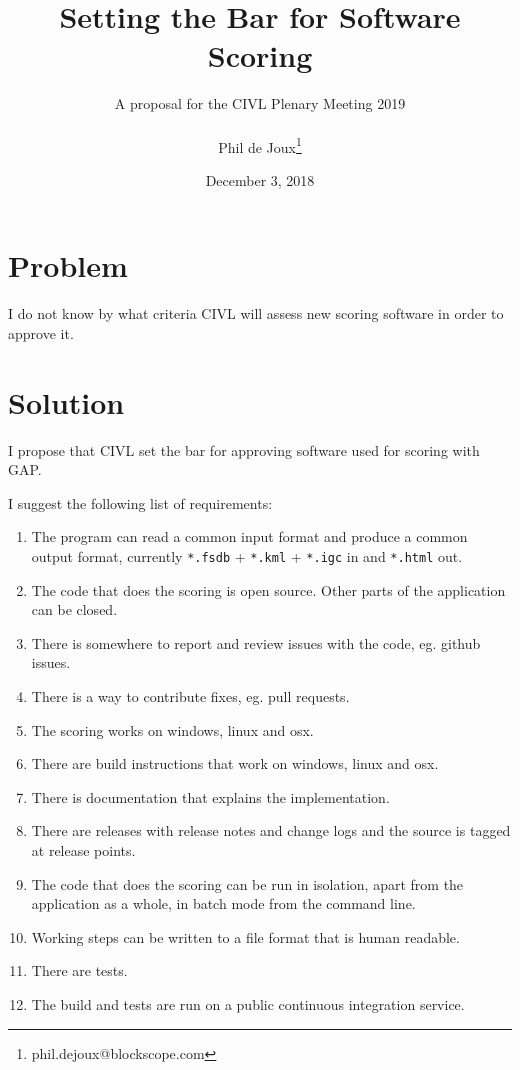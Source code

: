 \documentclass{article}
\title{Setting the Bar for Software Scoring}
\date{December 3, 2018}
\author{A proposal for the CIVL Plenary Meeting 2019\\\\
Phil de Joux\thanks{phil.dejoux@blockscope.com}}
\begin{document}
\maketitle
\section*{Problem}
I do not know by what criteria CIVL will assess new scoring software in order
to approve it.

\section*{Solution}
I propose that CIVL set the bar for approving software used for scoring with
GAP.

I suggest the following list of requirements:\\
\begin{enumerate}
    \item The program can read a common input format and produce a common
    output format, currently \texttt{*.fsdb} + \texttt{*.kml} + \texttt{*.igc}
    in and \texttt{*.html} out.
    \item The code that does the scoring is open source. Other parts of the
    application can be closed.
    \item There is somewhere to report and review issues with the code, eg.
    github issues.
    \item There is a way to contribute fixes, eg. pull requests.
    \item The scoring works on windows, linux and osx.
    \item There are build instructions that work on windows, linux and osx.
    \item There is documentation that explains the implementation.
    \item There are releases with release notes and change logs and the source
    is tagged at release points.
    \item The code that does the scoring can be run in isolation, apart from
    the application as a whole, in batch mode from the command line.
    \item Working steps can be written to a file format that is human readable.
    \item There are tests.
    \item The build and tests are run on a public continuous integration service.
\end{enumerate}
\end{document}
